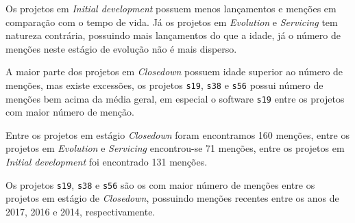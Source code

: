 


Os projetos em {\it Initial development} possuem menos lançamentos e menções em
comparação com o tempo de vida.  Já os projetos em {\it Evolution} e {\it
Servicing} tem natureza contrária, possuindo mais lançamentos do que a idade,
já o número de menções neste estágio de evolução não é mais disperso.

A maior parte dos projetos em {\it Closedown} possuem idade superior ao número
de menções, mas existe excessões, os projetos \texttt{s19}, \texttt{s38} e
\texttt{s56} possui número de menções bem acima da média geral, em especial o
software \texttt{s19} entre os projetos com maior número de menção.

Entre os projetos em estágio {\it Closedown} foram encontramos 160 menções,
entre os projetos em {\it Evolution} e {\it Servicing} encontrou-se 71 menções,
entre os projetos em {\it Initial development} foi encontrado 131 menções.

Os projetos \texttt{s19}, \texttt{s38} e \texttt{s56} são os com maior número de
menções entre os projetos em estágio de {\it Closedown}, possuindo menções
recentes entre os anos de 2017, 2016 e 2014, respectivamente.


